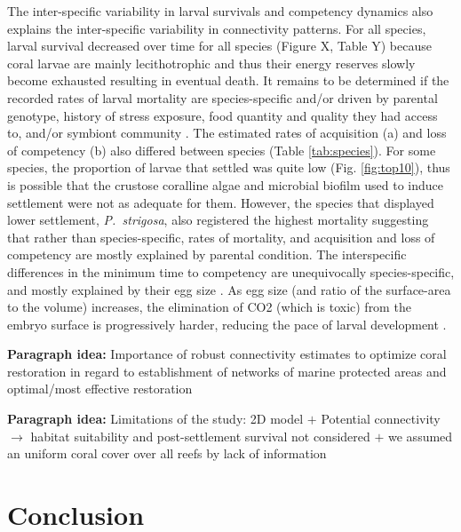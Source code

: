 \documentclass[preprint,12pt,authoryear]{elsarticle}
\begin{document}
The inter-specific variability in larval survivals and competency dynamics also explains the inter-specific variability in connectivity patterns. For all species, larval survival decreased over time for all species (Figure X, Table Y) because coral larvae are mainly lecithotrophic and thus their energy reserves slowly become exhausted resulting in eventual death. It remains to be determined if the recorded rates of larval mortality are species-specific and/or driven by parental genotype, history of stress exposure, food quantity and quality they had access to, and/or symbiont community \citep{jones2011tradeoffs, baums2013genotypic, padilla2013all, kirk2018genomic}. The estimated rates of acquisition (a) and loss of competency (b) also differed between species (Table \ref{tab:species}). For some species, the proportion of larvae that settled was quite low (Fig. \ref{fig:top10}), thus is possible that the crustose coralline algae and microbial biofilm used to induce settlement were not as adequate for them. However, the species that displayed lower settlement, \textit{P.~strigosa}, also registered the highest mortality suggesting that rather than species-specific, rates of mortality, and acquisition and loss of competency are mostly explained by parental condition. The interspecific differences in the minimum time to competency are unequivocally species-specific, and mostly explained by their egg size \citep{figueiredo2013synthesizing}. As egg size (and ratio of the surface-area to the volume) increases, the elimination of CO2 (which is toxic) from the embryo surface is progressively harder, reducing the pace of larval development \citep{berrill1935cell, einum2002egg}.



\textbf{Paragraph idea:} Importance of robust connectivity estimates to optimize coral restoration in regard to establishment of networks of marine protected areas and optimal/most effective restoration

\textbf{Paragraph idea:} Limitations of the study: 2D model $+$ Potential connectivity $\rightarrow$ habitat suitability and post-settlement survival not considered $+$ we assumed an uniform coral cover over all reefs by lack of information


\section*{Conclusion}

\lipsum[1-1]
\end{document}

